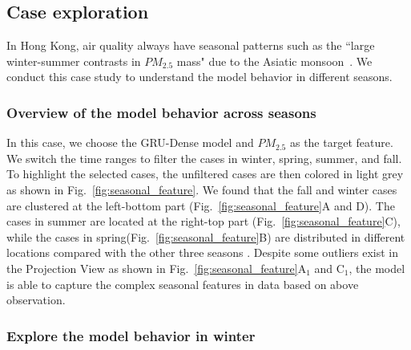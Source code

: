 \subsection{Case exploration}

In Hong Kong, air quality always have seasonal patterns such as the ``large winter-summer contrasts in $PM_{2.5}$ mass" due to the Asiatic monsoon~\cite{louie2005seasonal}. 
We conduct this case study to understand the model behavior in different seasons.  

\subsubsection{Overview of the model behavior across seasons}

In this case, we choose the GRU-Dense model and $PM_{2.5}$ as the target feature.
We switch the time ranges to filter the cases in winter, spring, summer, and fall. 
To highlight the selected cases, the unfiltered cases are then colored in light grey as shown in Fig.~\ref{fig:seasonal_feature}. 
We found that the fall and winter cases are clustered at the left-bottom part (Fig.~\ref{fig:seasonal_feature}A and D). 
The cases in summer are located at the right-top part (Fig.~\ref{fig:seasonal_feature}C), while the cases in spring(Fig.~\ref{fig:seasonal_feature}B) are distributed in different locations compared with the other three seasons .
Despite some outliers exist in the Projection View as shown in Fig.~\ref{fig:seasonal_feature}A$_1$ and C$_1$, the model is able to capture the complex seasonal features in data based on above observation. 

\subsubsection{Explore the model behavior in winter}

